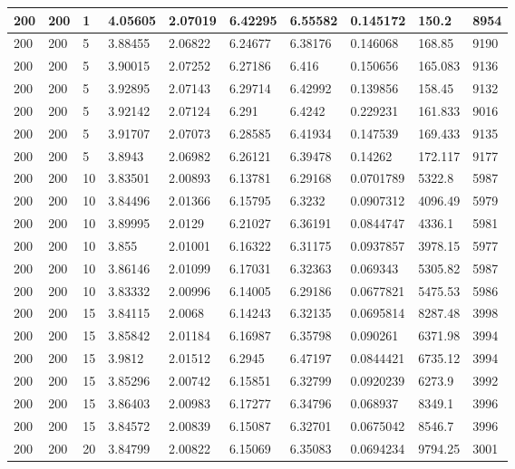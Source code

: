 \begin{landscape}
\begin{longtable}{ | l | l | l | l | l | l | l | l | l | l | }
200 & 200 & 1 & 4.05605 & 2.07019 & 6.42295 & 6.55582 & 0.145172 & 150.2 & 8954\\ \hline
200 & 200 & 5 & 3.88455 & 2.06822 & 6.24677 & 6.38176 & 0.146068 & 168.85 & 9190\\ \hline
200 & 200 & 5 & 3.90015 & 2.07252 & 6.27186 & 6.416 & 0.150656 & 165.083 & 9136\\ \hline
200 & 200 & 5 & 3.92895 & 2.07143 & 6.29714 & 6.42992 & 0.139856 & 158.45 & 9132\\ \hline
200 & 200 & 5 & 3.92142 & 2.07124 & 6.291 & 6.4242 & 0.229231 & 161.833 & 9016\\ \hline
200 & 200 & 5 & 3.91707 & 2.07073 & 6.28585 & 6.41934 & 0.147539 & 169.433 & 9135\\ \hline
200 & 200 & 5 & 3.8943 & 2.06982 & 6.26121 & 6.39478 & 0.14262 & 172.117 & 9177\\ \hline
200 & 200 & 10 & 3.83501 & 2.00893 & 6.13781 & 6.29168 & 0.0701789 & 5322.8 & 5987\\ \hline
200 & 200 & 10 & 3.84496 & 2.01366 & 6.15795 & 6.3232 & 0.0907312 & 4096.49 & 5979\\ \hline
200 & 200 & 10 & 3.89995 & 2.0129 & 6.21027 & 6.36191 & 0.0844747 & 4336.1 & 5981\\ \hline
200 & 200 & 10 & 3.855 & 2.01001 & 6.16322 & 6.31175 & 0.0937857 & 3978.15 & 5977\\ \hline
200 & 200 & 10 & 3.86146 & 2.01099 & 6.17031 & 6.32363 & 0.069343 & 5305.82 & 5987\\ \hline
200 & 200 & 10 & 3.83332 & 2.00996 & 6.14005 & 6.29186 & 0.0677821 & 5475.53 & 5986\\ \hline
200 & 200 & 15 & 3.84115 & 2.0068 & 6.14243 & 6.32135 & 0.0695814 & 8287.48 & 3998\\ \hline
200 & 200 & 15 & 3.85842 & 2.01184 & 6.16987 & 6.35798 & 0.090261 & 6371.98 & 3994\\ \hline
200 & 200 & 15 & 3.9812 & 2.01512 & 6.2945 & 6.47197 & 0.0844421 & 6735.12 & 3994\\ \hline
200 & 200 & 15 & 3.85296 & 2.00742 & 6.15851 & 6.32799 & 0.0920239 & 6273.9 & 3992\\ \hline
200 & 200 & 15 & 3.86403 & 2.00983 & 6.17277 & 6.34796 & 0.068937 & 8349.1 & 3996\\ \hline
200 & 200 & 15 & 3.84572 & 2.00839 & 6.15087 & 6.32701 & 0.0675042 & 8546.7 & 3996\\ \hline
200 & 200 & 20 & 3.84799 & 2.00822 & 6.15069 & 6.35083 & 0.0694234 & 9794.25 & 3001\\ \hline

\end{longtable}
\end{landscape}
